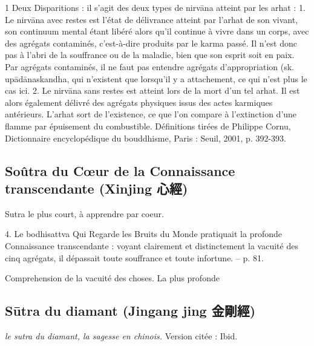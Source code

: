  1 Deux Disparitions : il s’agit des deux types de nirvāna atteint par les arhat : 1. Le nirvāna avec restes est l’état de délivrance atteint par l’arhat de son vivant, son continuum mental étant libéré alors qu’il continue à vivre dans un corps, avec des agrégats contaminés, c’est-à-dire produits par le karma passé. Il n’est donc pas à l’abri de la souffrance ou de la maladie, bien que son esprit soit en paix. Par agrégats contaminés, il ne faut pas entendre agrégats d’appropriation (sk. upādānaskandha, qui n’existent que lorsqu’il y a attachement, ce qui n’est plus le cas ici. 2. Le nirvāna sans restes est atteint lors de la mort d’un tel arhat. Il est alors également délivré des agrégats physiques issus des actes karmiques antérieurs. L’arhat sort de l’existence, ce que l’on compare à l’extinction d’une flamme par épuisement du combustible. Définitions tirées de Philippe Cornu, Dictionnaire encyclopédique du bouddhisme, Paris : Seuil, 2001, p. 392-393.

\subsection{Soûtra du Cœur de la Connaissance transcendante
(Xinjing 心經)}
Sutra le plus court, à apprendre par coeur. 


\begin{singlequote}
    4.	Le bodhisattva Qui Regarde les Bruits du Monde pratiquait la profonde Connaissance transcendante : voyant clairement et distinctement la vacuité des cinq agrégats, il dépassait toute souffrance et toute infortune.
-- p. 81.
\end{singlequote}

Comprehension de la vacuité des choses. La plus profonde
\subsection{Sūtra du diamant (Jingang jing 金剛經)}

\textit{le sutra du diamant, la sagesse en chinois.}
Version citée : Ibid.

